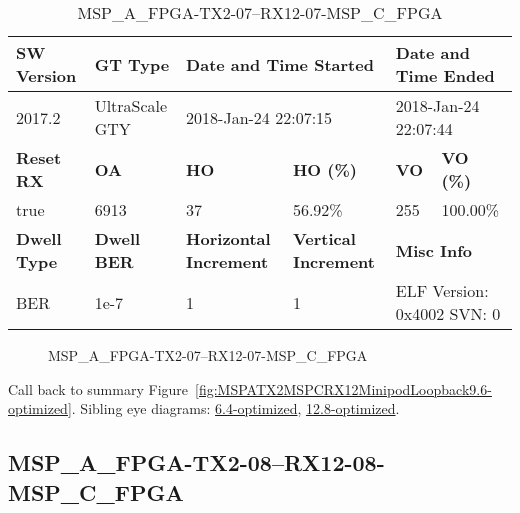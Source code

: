 \begin{table}[h]
\centering
\caption{MSP\_A\_FPGA-TX2-07--RX12-07-MSP\_C\_FPGA}
\label{tab:MSPAFPGATX207RX1207MSPCFPGA9.6-optimized}
\begin{tabular}{@{}|l|l|l|l|l|l|@{}}
\toprule
\textbf{SW Version}                & \textbf{GT Type}   & \multicolumn{2}{l|}{\textbf{Date and Time Started}}            & \multicolumn{2}{l|}{\textbf{Date and Time Ended}}        \\ \midrule
2017.2                       & UltraScale GTY          & \multicolumn{2}{l|}{2018-Jan-24 22:07:15}                   & \multicolumn{2}{l|}{2018-Jan-24 22:07:44}               \\ \midrule
\textbf{Reset RX}                  & \textbf{OA} & \textbf{HO}   & \textbf{HO (\%)} & \textbf{VO} & \textbf{VO (\%)} \\ \midrule
true & 6913        & 37          & 56.92\%        & 255        & 100.00\%       \\ \midrule
\textbf{Dwell Type}                & \textbf{Dwell BER} & \textbf{Horizontal Increment} & \textbf{Vertical Increment}    & \multicolumn{2}{l|}{\textbf{Misc Info}}                  \\ \midrule
BER                            & 1e-7        & 1        & 1           & \multicolumn{2}{l|}{ELF Version: 0x4002 SVN: 0}                         \\ \bottomrule
\end{tabular}
\end{table}

\begin{figure}[h]
\caption{MSP\_A\_FPGA-TX2-07--RX12-07-MSP\_C\_FPGA} \label{fig:MSPAFPGATX207RX1207MSPCFPGA9.6-optimized}
\end{figure}

Call back to summary Figure~\ref{fig:MSPATX2MSPCRX12MinipodLoopback9.6-optimized}.
Sibling eye diagrams: \hyperref[sec:MSPAFPGATX207RX1207MSPCFPGA6.4-optimized]{6.4-optimized}, \hyperref[sec:MSPAFPGATX207RX1207MSPCFPGA12.8-optimized]{12.8-optimized}.

\clearpage
\newpage


\subsection{MSP\_A\_FPGA-TX2-08--RX12-08-MSP\_C\_FPGA}\label{sec:MSPAFPGATX208RX1208MSPCFPGA9.6-optimized}

